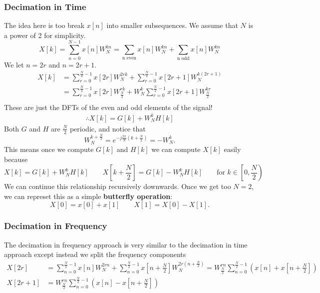 \subsubsection{Decimation in Time}
The idea here is too break $x[n]$ into smaller subsequences. We assume that $N$ is a power of 2 for simplicity.
\[
  X[k]=\sum_{n=0}^{N-1}x[n]W_N^{kn} = \sum_{\text{n even}}x[n]W_N^{kn}+\sum_{\text{n odd}}x[n]W_N^{kn}
\]
We let $n=2r$ and $n=2r+1$.
\begin{align*}
  X[k] &= \sum_{r=0}^{\frac{N}{2}-1}x[2r]W_N^{2rk}+\sum_{r=0}^{\frac{N}{2}-1}x[2r+1]W_N^{k(2r+1)}\\
  &= \sum_{r=0}^{\frac{N}{2}-1}x[2r]W_{\frac{N}{2}}^{rk}+W_N^k\sum_{r=0}^{\frac{N}{2}-1}x[2r+1]W_{\frac{N}{2}}^{kr}\\
\end{align*}
These are just the DFTs of the even and odd elements of the signal!
\begin{align*}
  \therefore X[k] = G[k] + W_N^kH[k]
\end{align*}
Both $G$ and $H$ are $\frac{N}{2}$ periodic, and notice that
\[
  W_N^{k+\frac{N}{2}}=e^{-j\frac{2\pi}{N}(k+\frac{N}{2})}= -W_N^k.
\]
This means once we compute $G[k]$ and $H[k]$ we can compute $X[k]$ easily because
\[
  X[k] = G[k]+W_N^kH[k]\qquad X\left[k+\frac{N}{2}\right]=G[k]-W_N^kH[k] \qquad \text{for }k\in\left[0, \frac{N}{2}\right)
\]
We can continue this relationship recursively downwards.
Once we get too $N=2$, we can represet this as a simple \textbf{butterfly operation}:
\[
  X[0] = x[0]+x[1] \qquad X[1] = X[0]-X[1].
\]
\subsubsection{Decimation in Frequency}
The decimation in frequency approach is very similar to the decimation in time approach except instead we split the frequency components
\begin{align*}
  X[2r] &= \sum_{n=0}^{\frac{N}{2}-1}x[n]W_N^{2rn}+\sum_{n=0}^{\frac{N}{2}-1}x\left[n+\frac{N}{2}\right]W_N^{2r\left(n+\frac{N}{2}\right)}=W_{\frac{N}{2}}^{rn}\sum_{n=0}^{\frac{N}{2}-1}\left(x[n]+x\left[n+\frac{N}{2}\right]\right)\\
  X[2r+1] &= W_{\frac{N}{2}}^{rn}\sum_{n=0}^{\frac{N}{2}-1}\left(x[n]-x\left[n+\frac{N}{2}\right]\right)
\end{align*}
